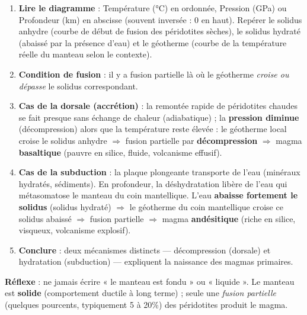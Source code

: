 \documentclass[11pt]{article}
\newcommand{\cle}[1]{{\popxbold\color{popdark}#1}}
\begin{document}
\begin{methode}
\begin{enumerate}
\item \textbf{Lire le diagramme} : Température (\si{\celsius}) en ordonnée, Pression (GPa) ou Profondeur (km) en abscisse (souvent inversée : 0 en haut). Repérer le \cle{solidus anhydre} (courbe de début de fusion des péridotites sèches), le \cle{solidus hydraté} (abaissé par la présence d'eau) et le \cle{géotherme} (courbe de la température réelle du manteau selon le contexte).
\item \textbf{Condition de fusion} : il y a fusion partielle là où le géotherme \emph{croise ou dépasse} le solidus correspondant.
\item \textbf{Cas de la dorsale (accrétion)} : la remontée rapide de péridotites chaudes se fait presque sans échange de chaleur (adiabatique) ; la \textbf{pression diminue} (décompression) alors que la température reste élevée : le géotherme local croise le solidus anhydre $\Rightarrow$ fusion partielle par \textbf{décompression} $\Rightarrow$ magma \textbf{basaltique} (pauvre en silice, fluide, volcanisme effusif).
\item \textbf{Cas de la subduction} : la plaque plongeante transporte de l'eau (minéraux hydratés, sédiments). En profondeur, la déshydratation libère de l'eau qui métasomatose le manteau du coin mantellique. L'eau \textbf{abaisse fortement le solidus} (solidus hydraté) $\Rightarrow$ le géotherme du coin mantellique croise ce solidus abaissé $\Rightarrow$ fusion partielle $\Rightarrow$ magma \textbf{andésitique} (riche en silice, visqueux, volcanisme explosif).
\item \textbf{Conclure} : deux mécanismes distincts — décompression (dorsale) et hydratation (subduction) — expliquent la naissance des magmas primaires.
\end{enumerate}
\textbf{Réflexe} : ne jamais écrire « le manteau est fondu » ou « liquide ». Le manteau est \textbf{solide} (comportement ductile à long terme) ; seule une \emph{fusion partielle} (quelques pourcents, typiquement 5 à 20\%) des péridotites produit le magma.
\end{methode}
\end{document}
